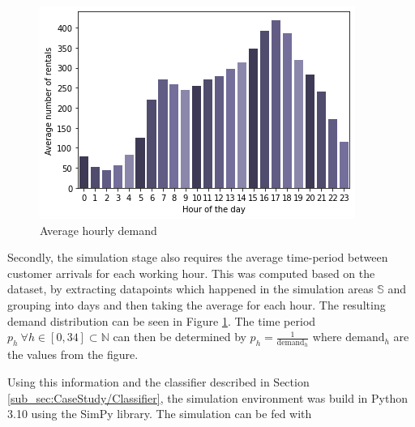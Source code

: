\begin{figure}[htbp]
  \centering
  \includegraphics[width=.3\linewidth]{./Figures/hourly-demand.png}
  \caption{Average hourly demand}
  \label{fig:Demand}
\end{figure}

Secondly, the simulation stage also requires the average time-period between customer arrivals for each working hour.
This was computed based on the dataset, by extracting datapoints which happened in the simulation areas $\mathbb{S}$ 
and grouping into days and then taking the average for each hour. The resulting
demand distribution can be seen in Figure \ref{fig:Demand}. The time period $p_h \ \forall h \in [0, 34] \subset \mathbb{N}$
can then be determined by $p_h = \frac{1}{\text{demand}_h}$ where $\text{demand}_h$ are the values from the figure.

Using this information and the classifier described in Section \ref{sub_sec:CaseStudy/Classifier}, the simulation environment
was build in Python 3.10 using the SimPy library. The simulation can be fed with 